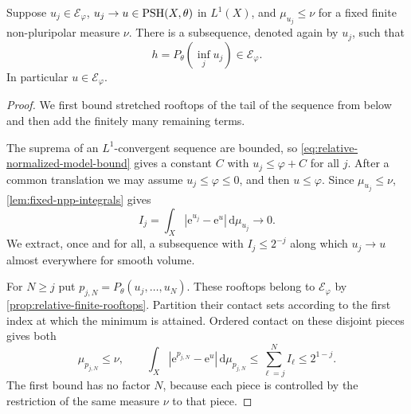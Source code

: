 \begin{lemma}\label{lem:dominated-relative-rooftop-extraction}
Suppose $u_j\in\mathcal E_\varphi$, $u_j\to u\in\mathrm{PSH}(X,\theta)$ in $L^1(X)$, and $\mu_{u_j}\leq\nu$ for a fixed finite non-pluripolar measure $\nu$. There is a subsequence, denoted again by $u_j$, such that
\[
 h=P_\theta\left(\inf_j u_j\right)\in\mathcal E_\varphi.
\]
In particular $u\in\mathcal E_\varphi$.
\end{lemma}
\begin{proof}
We first bound stretched rooftops of the tail of the sequence from below and then add the finitely many remaining terms.

The suprema of an $L^1$-convergent sequence are bounded, so \eqref{eq:relative-normalized-model-bound} gives a constant $C$ with $u_j\leq\varphi+C$ for all $j$. After a common translation we may assume $u_j\leq\varphi\leq0$, and then $u\leq\varphi$. Since $\mu_{u_j}\leq\nu$, \cref{lem:fixed-npp-integrals} gives
\[
 I_j=\int_X|\mathrm{e}^{u_j}-\mathrm{e}^u|\,\mathrm{d}\mu_{u_j}\longrightarrow0.
\]
We extract, once and for all, a subsequence with $I_j\leq2^{-j}$ along which $u_j\to u$ almost everywhere for smooth volume.

For $N\geq j$ put $p_{j,N}=P_\theta(u_j,\ldots,u_N)$. These rooftops belong to $\mathcal E_\varphi$ by \cref{prop:relative-finite-rooftops}. Partition their contact sets according to the first index at which the minimum is attained. Ordered contact on these disjoint pieces gives both
\begin{equation}\label{eq:finite-rooftop-common-domination}
 \mu_{p_{j,N}}\leq\nu,
 \qquad
 \int_X|\mathrm{e}^{p_{j,N}}-\mathrm{e}^u|\,\mathrm{d}\mu_{p_{j,N}}
 \leq\sum_{\ell=j}^N I_\ell\leq2^{1-j}.
\end{equation}
The first bound has no factor $N$, because each piece is controlled by the restriction of the same measure $\nu$ to that piece.


\end{proof}

